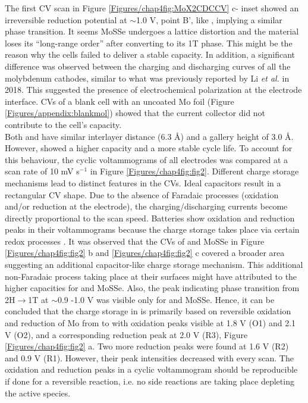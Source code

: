 The first CV scan in Figure \ref{Figures/chap4fig:MoX2CDCCV} c- inset showed an irreversible reduction potential at $\sim$1.0 V, point B', like , implying a similar phase transition. It seems MoSSe undergoes a lattice distortion and the material loses its \enquote{long-range order} after converting to its 1T phase. This might be the reason why the cells failed to deliver a stable capacity. In addition, a significant difference was observed between the charging and discharging curves of all the molybdenum cathodes, similar to what was previously reported by Li \textit{et al.} in 2018. This suggested the presence of electrochemical polarization at the electrode interface. %
CVs of a blank cell with an uncoated Mo foil (Figure \ref{Figures/appendix:blankmol}) showed that the current collector did not contribute to the cell's capacity. \\
Both  and  have similar interlayer distance (6.3 \AA) and a gallery height of 3.0 \AA. However,  showed a higher capacity and a more stable cycle life. To account for this behaviour, the cyclic voltammograms of all electrodes was compared at a scan rate of 10 mV s$^{-1}$ in Figure \ref{Figures/chap4fig:fig2}. Different charge storage mechanisms lead to distinct features in the CVs. Ideal capacitors result in a rectangular CV shape. Due to the absence of Faradaic processes (oxidation and/or reduction at the electrode), the charging/discharging currents become directly proportional to the scan speed. Batteries show oxidation and reduction peaks in their voltammograms because the charge storage takes place via certain redox processes \cite{jiao_aluminum-ion_2016}. It was observed that the CVs of  and MoSSe in Figure \ref{Figures/chap4fig:fig2} b and \ref{Figures/chap4fig:fig2} c covered a broader area suggesting an additional capacitor-like charge storage mechanism. This additional non-Faradaic process taking place at their surfaces might have attributed to the higher capacities for  and  MoSSe. Also, the peak indicating phase transition from 2H$\rightarrow$1T at $\sim$0.9 -1.0 V was visible only for  and MoSSe. Hence, it can be concluded that the charge storage in  is primarily based on reversible oxidation and reduction of Mo from  to  with oxidation peaks visible at 1.8 V (O1) and 2.1 V (O2), and a corresponding reduction peak at 2.0 V (R3), Figure \ref{Figures/chap4fig:fig2} a. Two more reduction peaks were found at 1.6 V (R2) and 0.9 V (R1). However, their peak intensities decreased with every scan. The oxidation and reduction peaks in a cyclic voltammogram should be reproducible if done for a reversible reaction, i.e. no side reactions are taking place depleting the active species.\\
